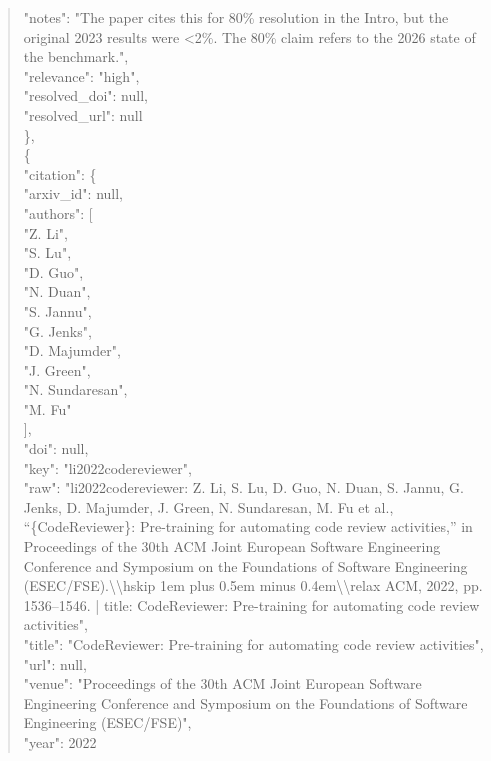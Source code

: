 \documentclass[11pt]{article}
\begin{document}
\begin{quote}
      "notes": "The paper cites this for 80\% resolution in the Intro, but the original 2023 results were <2\%. The 80\% claim refers to the 2026 state of the benchmark.",\\
      "relevance": "high",\\
      "resolved\_doi": null,\\
      "resolved\_url": null\\
    \},\\
    \{\\
      "citation": \{\\
        "arxiv\_id": null,\\
        "authors": [\\
          "Z. Li",\\
          "S. Lu",\\
          "D. Guo",\\
          "N. Duan",\\
          "S. Jannu",\\
          "G. Jenks",\\
          "D. Majumder",\\
          "J. Green",\\
          "N. Sundaresan",\\
          "M. Fu"\\
        ],\\
        "doi": null,\\
        "key": "li2022codereviewer",\\
        "raw": "li2022codereviewer: Z. Li, S. Lu, D. Guo, N. Duan, S. Jannu, G. Jenks, D. Majumder, J. Green, N. Sundaresan, M. Fu et al., ``\{CodeReviewer\}: Pre-training for automating code review activities,'' in Proceedings of the 30th ACM Joint European Software Engineering Conference and Symposium on the Foundations of Software Engineering (ESEC/FSE).\textbackslash{}\textbackslash{}hskip 1em plus 0.5em minus 0.4em\textbackslash{}\textbackslash{}relax ACM, 2022, pp. 1536--1546. | title: CodeReviewer: Pre-training for automating code review activities",\\
        "title": "CodeReviewer: Pre-training for automating code review activities",\\
        "url": null,\\
        "venue": "Proceedings of the 30th ACM Joint European Software Engineering Conference and Symposium on the Foundations of Software Engineering (ESEC/FSE)",\\
        "year": 2022\\

\end{quote}
\end{document}
